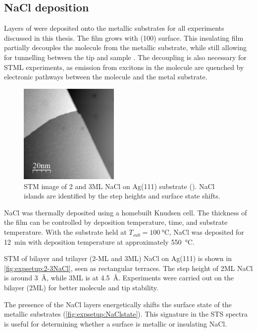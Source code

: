 \subsection*{NaCl deposition}

Layers of  were deposited onto the metallic substrates for all experiments discussed in this thesis. The film grows with (100) surface. This insulating film partially decouples the molecule from the metallic substrate, while still allowing for tunnelling between the tip and sample \citep{repp2005molecules}. The decoupling is also necessary for \ac{STML} experiments, as emission from excitons in the molecule are quenched by electronic pathways between the molecule and the metal substrate.

\begin{figure} [h]
    \centering
    \includegraphics[width=0.43\textwidth]{pictures/2-3ML_nacl_ag111_1V_10pA.jpg}
    \caption{STM image of 2 and 3ML NaCl on Ag(111) substrate (). NaCl islands are identified by the step heights and surface state shifts. }
    \label{fig:expsetup:2-3NaCl}
\end{figure}

NaCl was thermally deposited using a homebuilt Knudsen cell. The thickness of the film can be controlled by deposition temperature, time, and substrate temperature. With the substrate held at $T_{sub} = \SI{100}{\celsius}$, NaCl was deposited for \SI{12}{\minute} with deposition temperature at approximately \SI{550}{\celsius}. 

\ac{STM} of bilayer and trilayer (2-\acf{ML} and 3\ac{ML}) NaCl on Ag(111) is shown in \autoref{fig:expsetup:2-3NaCl}, seen as rectangular terraces. The step height of 2\ac{ML} NaCl is around \SI{3}{\angstrom}, while 3\ac{ML} is at \SI{4.5}{\angstrom}. Experiments were carried out on the bilayer (2\ac{ML}) for better molecule and tip stability.

The presence of the NaCl layers energetically shifts the surface state of the metallic substrates (\autoref{fig:expsetup:NaClstate}). This signature in the \ac{STS} spectra is useful for determining whether a surface is metallic or insulating NaCl.

